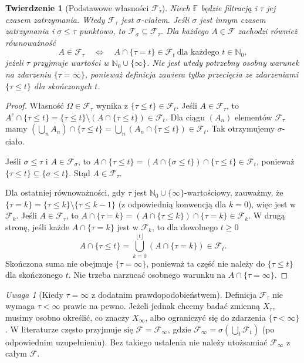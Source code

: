 \documentclass[11pt,a4paper,oneside]{report}
\numberwithin{equation}{chapter}
\theoremstyle{plain}
\newtheorem{twierdzenie}{Twierdzenie}[chapter]
\theoremstyle{definition}
\theoremstyle{remark}
\newtheorem{uwaga}{Uwaga}[chapter]
\newcommand{\N}{\mathbb{N}}
\newcommand{\calF}{\mathcal{F}}
\begin{document}
\begin{twierdzenie}[Podstawowe własności $\calF_\tau$]
Niech $\mathbb F$ będzie filtracją i $\tau$ jej czasem
zatrzymania. Wtedy $\calF_\tau$ jest $\sigma$-ciałem.
Jeśli $\sigma$ jest innym czasem zatrzymania i
$\sigma\le\tau$ punktowo, to
$\calF_\sigma\subseteq\calF_\tau$.
Dla każdego $A\in\calF$ zachodzi również równoważność
\[
A\in\calF_\tau
\quad\Longleftrightarrow\quad
A\cap\{\tau=t\}\in\calF_t
\ \text{dla każdego }t\in\N_0,
\]
\emph{jeżeli} $\tau$ przyjmuje wartości w $\N_0\cup\{\infty\}$.
Nie jest wtedy potrzebny osobny warunek na zdarzeniu
$\{\tau=\infty\}$, ponieważ definicja zawiera tylko
przecięcia ze zdarzeniami $\{\tau\le t\}$ dla skończonych $t$.
\end{twierdzenie}
\begin{proof}
Własność $\Omega\in\calF_\tau$ wynika z
$\{\tau\le t\}\in\calF_t$.
Jeśli $A\in\calF_\tau$, to
$A^c\cap\{\tau\le t\}
=\{\tau\le t\}\setminus(A\cap\{\tau\le t\})\in\calF_t$.
Dla ciągu $(A_n)$ elementów $\calF_\tau$ mamy
$(\bigcup_nA_n)\cap\{\tau\le t\}
=\bigcup_n(A_n\cap\{\tau\le t\})\in\calF_t$.
Tak otrzymujemy $\sigma$-ciało.

Jeśli $\sigma\le\tau$ i $A\in\calF_\sigma$, to
$A\cap\{\tau\le t\}
=(A\cap\{\sigma\le t\})\cap\{\tau\le t\}\in\calF_t$,
ponieważ $\{\tau\le t\}\subseteq\{\sigma\le t\}$.
Stąd $A\in\calF_\tau$.

Dla ostatniej równoważności, gdy $\tau$ jest
$\N_0\cup\{\infty\}$-wartościowy, zauważmy, że
$\{\tau=k\}=\{\tau\le k\}\setminus\{\tau\le k-1\}$
(z odpowiednią konwencją dla $k=0$), więc jest w $\calF_k$.
Jeśli $A\in\calF_\tau$, to
$A\cap\{\tau=k\}
=(A\cap\{\tau\le k\})\cap\{\tau=k\}\in\calF_k$.
W drugą stronę, jeśli każde $A\cap\{\tau=k\}$
jest w $\calF_k$, to dla dowolnego $t\ge0$
\[
A\cap\{\tau\le t\}
=\bigcup_{k=0}^{\lfloor t\rfloor}
(A\cap\{\tau=k\})\in\calF_t.
\]
Skończona suma nie obejmuje $\{\tau=\infty\}$,
ponieważ ta część nie należy do $\{\tau\le t\}$
dla skończonego $t$. Nie trzeba narzucać osobnego
warunku na $A\cap\{\tau=\infty\}$.
\end{proof}

\begin{uwaga}[Kiedy $\tau=\infty$ z dodatnim prawdopodobieństwem]
Definicja $\calF_\tau$ nie wymaga $\tau<\infty$
prawie na pewno. Jeżeli jednak chcemy badać zmienną
$X_\tau$, musimy osobno określić, co znaczy $X_\infty$,
albo ograniczyć się do zdarzenia $\{\tau<\infty\}$.
W literaturze często przyjmuje się $\calF=\calF_\infty$,
gdzie $\calF_\infty=\sigma(\bigcup_t\calF_t)$
(po odpowiednim uzupełnieniu). Bez takiego ustalenia
nie należy utożsamiać $\calF_\infty$ z całym $\calF$.
\end{uwaga}
\end{document}

